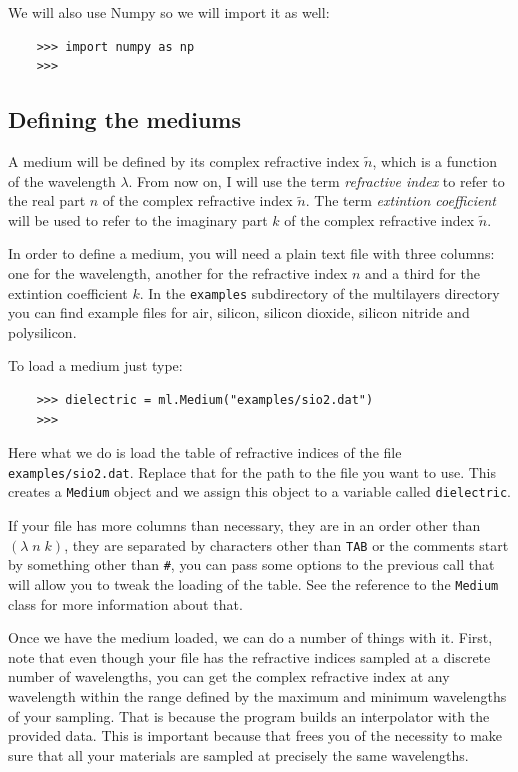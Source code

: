 \documentclass[a4paper,11pt,aps,final]{revtex4}
\begin{document}
We will also use \textsf{Numpy} so we will import it as well:
\begin{verbatim}
    >>> import numpy as np
    >>>
\end{verbatim}


\subsection{Defining the mediums}
A medium will be defined by its complex refractive index $\tilde n$, which is a function of the wavelength $\lambda$. From now on, I will use the term \emph{refractive index} to refer to the real part $n$ of the complex refractive index $\tilde n$. The term \emph{extintion coefficient} will be used to refer to the imaginary part $k$ of the complex refractive index $\tilde n$.

In order to define a medium, you will need a plain text file with three columns: one for the wavelength, another for the refractive index $n$ and a third for the extintion coefficient $k$. In the \texttt{examples} subdirectory of the \textsf{multilayers} directory you can find example files for air, silicon, silicon dioxide, silicon nitride and polysilicon.

To load a medium just type:
\begin{verbatim}
    >>> dielectric = ml.Medium("examples/sio2.dat")
    >>>
\end{verbatim}

Here what we do is load the table of refractive indices of the file \texttt{examples/sio2.dat}. Replace that for the path to the file you want to use. This creates a \texttt{Medium} object and we assign this object to a variable called \texttt{dielectric}.

If your file has more columns than necessary, they are in an order other than $(\lambda\;n\;k)$, they are separated by characters other than \texttt{TAB} or the comments start by something other than \texttt{\#}, you can pass some options to the previous call that will allow you to tweak the loading of the table. See the reference to the \texttt{Medium} class for more information about that.

Once we have the medium loaded, we can do a number of things with it. First, note that even though your file has the refractive indices sampled at a discrete number of wavelengths, you can get the complex refractive index at any wavelength within the range defined by the maximum and minimum wavelengths of your sampling. That is because the program builds an interpolator with the provided data. This is important because that frees you of the necessity to make sure that all your materials are sampled at precisely the same wavelengths.
\end{document}

